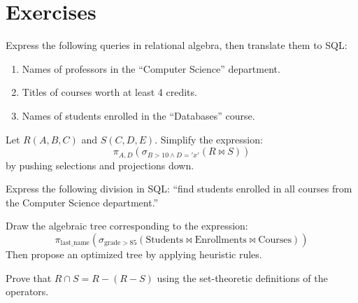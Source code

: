 \section*{Exercises}

\begin{exercise}
Express the following queries in relational algebra, then translate them to SQL:
\begin{enumerate}
    \item Names of professors in the ``Computer Science'' department.
    \item Titles of courses worth at least 4 credits.
    \item Names of students enrolled in the ``Databases'' course.
\end{enumerate}
\end{exercise}

\begin{exercise}
Let $R(A, B, C)$ and $S(C, D, E)$. Simplify the expression:
\[
\pi_{A, D}(\sigma_{B > 10 \land D = 'x'}(R \bowtie S))
\]
by pushing selections and projections down.
\end{exercise}

\begin{exercise}
Express the following division in SQL: ``find students enrolled in all
courses from the Computer Science department.''
\end{exercise}

\begin{exercise}
Draw the algebraic tree corresponding to the expression:
\[
\pi_{\text{last\_name}}(\sigma_{\text{grade} > 85}(\text{Students} \bowtie \text{Enrollments} \bowtie \text{Courses}))
\]
Then propose an optimized tree by applying heuristic rules.
\end{exercise}

\begin{exercise}
Prove that $R \cap S = R - (R - S)$ using the set-theoretic definitions
of the operators.
\end{exercise}
